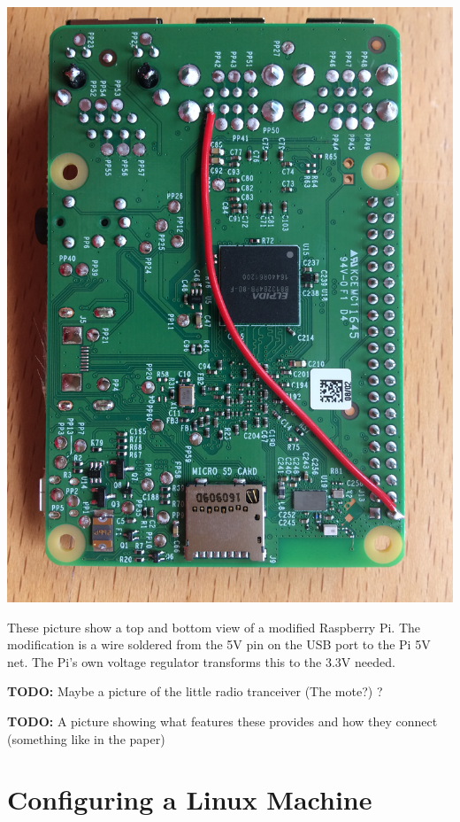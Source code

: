 \documentclass[12pt]{article} %
\newcommand{\todo}[1]{{\color{red} \textbf{TODO:} #1}}
\begin{document}
\begin{minipage}{0.33\textwidth}
  \noindent \includegraphics[width=\textwidth]{./photos/Pi2.JPG}
\end{minipage}
\begin{minipage}{0.66\textwidth} %
  These picture show a top and bottom view of a modified Raspberry
  Pi. The modification is a wire soldered from the 5V pin on the USB
  port to the Pi 5V net. The Pi's own voltage regulator transforms
  this to the 3.3V needed.
\end{minipage}

\todo{Maybe a picture of the little radio tranceiver (The mote?) ?}

\todo{A picture showing what features these provides and how they
  connect (something like in the paper)}


\section{Configuring a Linux Machine}
\end{document}

